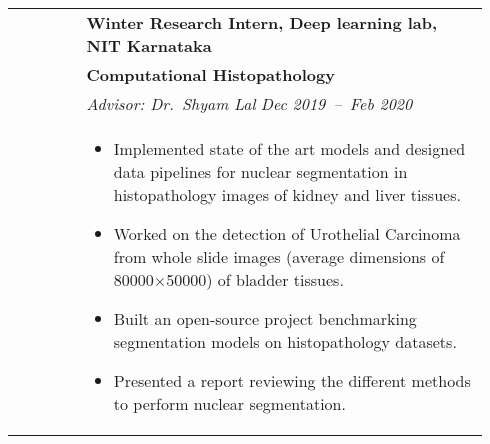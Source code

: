 \documentclass[letterpaper, 10pt, oneside]{article}
\newcommand{\bdit}[1]{{\textbf{#1}}}
\begin{document}
\begin{longtable}{@{} p{0.14\linewidth} p{0.8\linewidth}}
                         & \bdit{Winter Research Intern, Deep learning lab, NIT Karnataka}                                                                                                                                                   \\
                         & \bdit{Computational Histopathology}                                                                                                                                                                               \\
                         & \textsl{Advisor: Dr.\ Shyam Lal} \hfill \hspace{-3em} \textsl{Dec 2019\ --\ Feb 2020}                                                                                                                             \\
                         & \parbox{0.8\textwidth}{                                                                                                                                                                                           %
        \begin{itemize}[leftmargin=*, itemsep=-0.88ex, topsep=-0.88ex]
            \item Implemented state of the art models and designed data pipelines for nuclear segmentation in histopathology images of kidney and liver tissues.
            \item Worked on the detection of Urothelial Carcinoma from whole slide images (average dimensions of 80000$\times$50000) of bladder tissues.
            \item Built an open-source project benchmarking segmentation models on histopathology datasets.
            \item Presented a report reviewing the different methods to perform nuclear segmentation.
        \end{itemize}
    }
    \\
    \\


\end{longtable}
\end{document}
